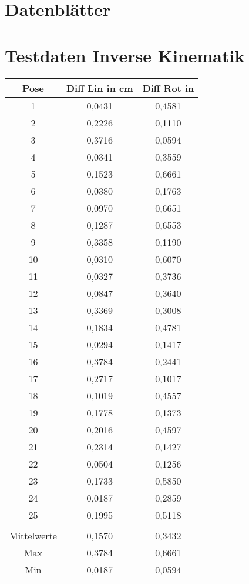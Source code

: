 \begin{appendix}

    
    \section{Datenblätter}
    \label{app:daten}
    
    \section{Testdaten Inverse Kinematik}
    \label{app:tdik}
    
    \begin{tabular}{|c|c|c|}
    	\hline
    	Pose&Diff Lin in cm&Diff Rot in \textdegree \\
    	    	\hline
    	1&0,0431&0,4581\\
    	    	\hline
    	2&0,2226&0,1110\\
    	    	\hline
    	3&0,3716&0,0594\\
    	    	\hline
    	4&0,0341&0,3559\\
    	    	\hline
    	5&0,1523&0,6661\\
    	    	\hline
    	6&0,0380&0,1763\\    	\hline
    	7&0,0970&0,6651\\    	\hline
    	8&0,1287&0,6553\\    	\hline
    	9&0,3358&0,1190\\    	\hline
    	10&0,0310&0,6070\\    	\hline
    	11&0,0327&0,3736\\    	\hline
    	12&0,0847&0,3640\\    	\hline
    	13&0,3369&0,3008\\    	\hline
    	14&0,1834&0,4781\\    	\hline
    	15&0,0294&0,1417\\    	\hline
    	16&0,3784&0,2441\\    	\hline
    	17&0,2717&0,1017\\    	\hline
    	18&0,1019&0,4557\\    	\hline
    	19&0,1778&0,1373\\    	\hline
    	20&0,2016&0,4597\\    	\hline
    	21&0,2314&0,1427\\    	\hline
    	22&0,0504&0,1256\\    	\hline
    	23&0,1733&0,5850\\    	\hline
    	24&0,0187&0,2859\\    	\hline
    	25&0,1995&0,5118\\    	\hline
    	\\    	\hline
    	Mittelwerte&0,1570&0,3432\\    	\hline
    	Max&0,3784&0,6661\\    	\hline
    	Min&0,0187&0,0594\\    	\hline
    	
    	
    \end{tabular} 
    
    
\end{appendix}


